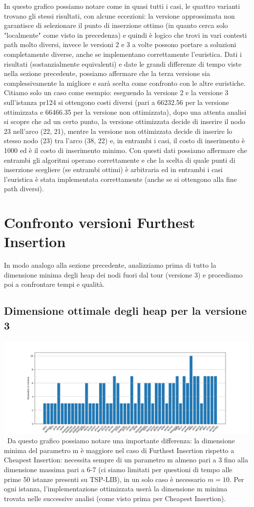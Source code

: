 \documentclass[a4paper,12pt]{report}
\begin{document}
In questo grafico possiamo notare come in quasi tutti i casi, le quattro varianti trovano gli stessi risultati, con alcune eccezioni: la versione approssimata non garantisce di selezionare il punto di inserzione ottimo (in quanto cerca solo "localmente" come visto in precedenza) e quindi è logico che trovi in vari contesti path molto diversi, invece le versioni 2 e 3 a volte possono portare a soluzioni completamente diverse, anche se implementano correttamente l'euristica. Dati i risultati (sostanzialmente equivalenti) e date le grandi differenze di tempo viste nella sezione precedente, possiamo affermare che la terza versione sia complessivamente la migliore e sarà scelta come confronto con le altre euristiche. Citiamo solo un caso come esempio: eseguendo la versione 2 e la versione 3 sull'istanza pr124 si ottengono costi diversi (pari a 66232.56 per la versione ottimizzata e 66466.35 per la versione non ottimizzata), dopo una attenta analisi si scopre che ad un certo punto, la versione ottimizzata decide di inserire il nodo 23 nell'arco (22, 21), mentre la versione non ottimizzata decide di inserire lo stesso nodo (23) tra l'arco (38, 22) e, in entrambi i casi, il costo di inserimento è 1000 ed è il costo di inserimento minimo. Con questi dati possiamo affermare che entrambi gli algoritmi operano correttamente e che la scelta di quale punti di inserzione scegliere (se entrambi ottimi) è arbitraria ed in entrambi i casi l'euristica è stata implementata correttamente (anche se si ottengono alla fine path diversi).

\section{Confronto versioni Furthest Insertion}
In modo analogo alla sezione precedente, analizziamo prima di tutto la dimensione minima degli heap dei nodi fuori dal tour (versione 3) e procediamo poi a confrontare tempi e qualità.
\subsection{Dimensione ottimale degli heap per la versione 3 }
\includegraphics[width=1\textwidth]{../Grafici/4.png} \
Da questo grafico possiamo notare una importante differenza: la dimensione minima del parametro m è maggiore nel caso di Furthest Insertion rispetto a Cheapest Insertion: necessita sempre di un parametro m almeno pari a 3 fino alla dimensione massima pari a 6-7 (ci siamo limitati per questioni di tempo alle prime 50 istanze presenti su TSP-LIB), in un solo caso è necessario $m=10$. Per ogni istanza, l'implementazione ottimizzata userà la dimensione m minima trovata nelle successive analisi (come visto prima per Cheapest Insertion).
\end{document}
